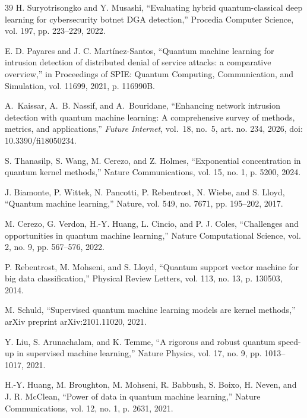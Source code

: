 \begin{thebibliography}{39}
H. Suryotrisongko and Y. Musashi, ``Evaluating hybrid quantum-classical deep learning for cybersecurity botnet DGA detection,'' Procedia Computer Science, vol. 197, pp. 223--229, 2022.


E. D. Payares and J. C. Mart\'inez-Santos, ``Quantum machine learning for intrusion detection of distributed denial of service attacks: a comparative overview,'' in Proceedings of SPIE: Quantum Computing, Communication, and Simulation, vol. 11699, 2021, p. 116990B.

A.~Kaissar, A.~B. Nassif, and A.~Bouridane, ``Enhancing network intrusion
detection with quantum machine learning: A comprehensive survey of methods,
metrics, and applications,'' \emph{Future Internet}, vol.~18, no.~5,
art. no. 234, 2026, doi: 10.3390/fi18050234.

S. Thanasilp, S. Wang, M. Cerezo, and Z. Holmes, ``Exponential concentration in quantum kernel methods,'' Nature Communications, vol. 15, no. 1, p. 5200, 2024.

J. Biamonte, P. Wittek, N. Pancotti, P. Rebentrost, N. Wiebe, and S. Lloyd, ``Quantum machine learning,'' Nature, vol. 549, no. 7671, pp. 195--202, 2017.

M. Cerezo, G. Verdon, H.-Y. Huang, L. Cincio, and P. J. Coles, ``Challenges and opportunities in quantum machine learning,'' Nature Computational Science, vol. 2, no. 9, pp. 567--576, 2022.

P. Rebentrost, M. Mohseni, and S. Lloyd, ``Quantum support vector machine for big data classification,'' Physical Review Letters, vol. 113, no. 13, p. 130503, 2014.

M. Schuld, ``Supervised quantum machine learning models are kernel methods,'' arXiv preprint arXiv:2101.11020, 2021.

Y. Liu, S. Arunachalam, and K. Temme, ``A rigorous and robust quantum speed-up in supervised machine learning,'' Nature Physics, vol. 17, no. 9, pp. 1013--1017, 2021.

H.-Y. Huang, M. Broughton, M. Mohseni, R. Babbush, S. Boixo, H. Neven, and J. R. McClean, ``Power of data in quantum machine learning,'' Nature Communications, vol. 12, no. 1, p. 2631, 2021.


\end{thebibliography}

